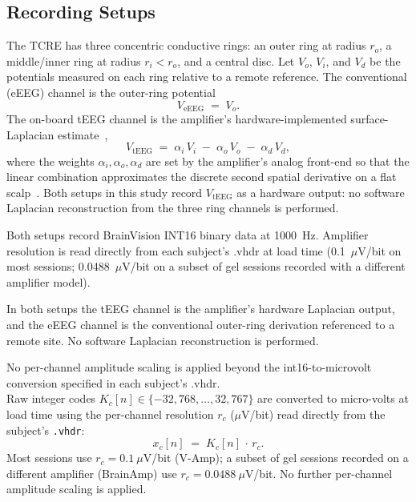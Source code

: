 \documentclass[10pt,a4paper]{article}
\providecommand{\upmu}{\ensuremath{\mu}}        %
\begin{document}
\subsection{Recording Setups}
The TCRE has three concentric conductive rings: an outer ring at radius $r_{o}$, a middle/inner ring at radius $r_{i}<r_{o}$, and a central disc. Let $V_{o}$, $V_{i}$, and $V_{d}$ be
   the potentials measured on each ring relative to a remote reference. The conventional (eEEG) channel is the outer-ring potential
  \begin{equation}
  V_{\mathrm{eEEG}} \;=\; V_{o}.
  \label{eq:eeeg}
  \end{equation}
  The on-board tEEG channel is the amplifier's hardware-implemented surface-Laplacian estimate~\cite{besio2006},
  \begin{equation}
  V_{\mathrm{tEEG}}
  \;=\;
  \alpha_{i}\,V_{i} \;-\; \alpha_{o}\,V_{o} \;-\; \alpha_{d}\,V_{d},
  \label{eq:teeg}
  \end{equation}
  where the weights $\alpha_{i},\alpha_{o},\alpha_{d}$ are set by the amplifier's analog front-end so that the linear combination approximates the discrete second spatial derivative on
   a flat scalp~\cite{besio2006,koka2007}. Both setups in this study record $V_{\mathrm{tEEG}}$ as a hardware output: no software Laplacian reconstruction from the three ring channels
  is performed.

Both setups record BrainVision INT16 binary data at 1000~Hz. Amplifier resolution is read directly from each subject's .vhdr at load time (0.1~$\upmu$V/bit on most sessions; 0.0488~$\upmu$V/bit on a subset of gel sessions recorded with a different amplifier model).

In both setups the tEEG channel is the amplifier's hardware Laplacian output, and the eEEG channel is the conventional outer-ring derivation referenced to a remote site. No software Laplacian reconstruction is performed.

No per-channel amplitude scaling is applied beyond the int16-to-microvolt conversion specified in each subject's .vhdr.\\
  Raw integer codes $K_{c}[n]\in\{-32{,}768,\ldots,32{,}767\}$ are converted to micro-volts at load time using the per-channel resolution $r_{c}$ ($\upmu$V/bit) read directly from the
  subject's \texttt{.vhdr}:
  \begin{equation}
  x_{c}[n] \;=\; K_{c}[n]\,\cdot\,r_{c}.
  \label{eq:adc}
  \end{equation}
  Most sessions use $r_{c}=0.1\ \upmu$V/bit (V-Amp); a subset of gel sessions recorded on a different amplifier (BrainAmp) use $r_{c}=0.0488\ \upmu$V/bit. No further per-channel
  amplitude scaling is applied.
\end{document}
